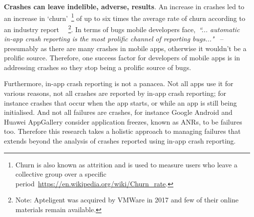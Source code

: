 \textbf{Crashes can leave indelible, adverse, results}. An increase in crashes led to an increase in `churn'~\footnote{Churn is also known as attrition and is used to measure users who leave a collective group over a specific period~\url{https://en.wikipedia.org/wiki/Churn_rate}.} of up to six times the average rate of churn according to an industry report ~\citep{levy2016_crash_and_churn_report, levy2017_the_crash_and_burn_report_findings}~\footnote{Note: Apteligent was acquired by VMWare in 2017 and few of their online materials remain available.}. %
In terms of bugs mobile developers face,~\emph{``... automatic in-app crash reporting is the most prolific channel of reporting bugs..."}~\citep{alsubaihin2019app_store_effects_on_software_engineering} %
-- presumably as there are many crashes in mobile apps, otherwise it wouldn't be a prolific source. Therefore, one success factor for developers of mobile apps is in addressing crashes so they stop being a prolific source of bugs. 

Furthermore, in-app crash reporting is not a panacea. Not all apps use it for various reasons, not all crashes are reported by in-app crash reporting; for instance crashes that occur when the app starts, or while an app is still being initialised. And not all failures are crashes, for instance Google Android and Huawei AppGallery consider application freezes, known as ANRs, to be failures too. Therefore this research takes a holistic approach to managing failures that extends beyond the analysis of crashes reported using in-app crash reporting.   %

